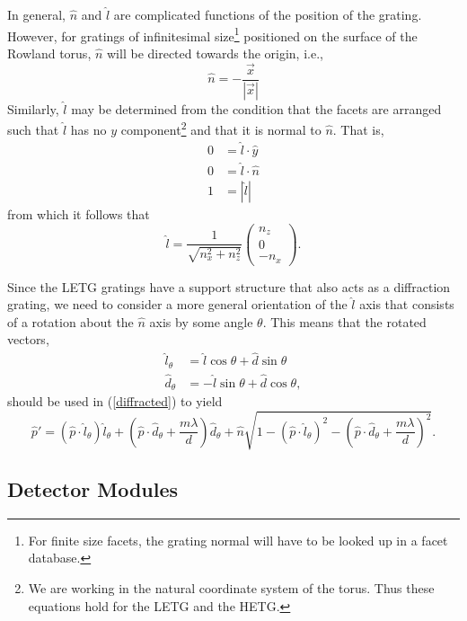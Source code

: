 \documentclass{article}
\newcommand{\eq}[1]{(\ref{#1})}
\newcommand{\p}{\hat{p}}
\newcommand{\x}{\vec{x}}
\begin{document}
 In general, $\hat{n}$ and $\hat{l}$ are complicated functions of the
 position of the grating.  However, for gratings of infinitesimal
 size\footnote{For finite size facets, the grating normal will have to be
 looked up in a facet database.} positioned on the surface of the Rowland
 torus, $\hat{n}$ will be directed towards the origin, i.e.,
\begin{equation}
    \hat{n} = -\frac{\x}{|\x|}
\end{equation}
 Similarly, $\hat{l}$ may be determined from the condition that the facets
 are arranged such that $\hat{l}$ has no $y$ component\footnote{We are
 working in the natural coordinate system of the torus.  Thus these
 equations hold for the LETG and the HETG.} and that it is normal to
 $\hat{n}$.  That is,
\begin{equation*}
\begin{split}
   0 &= \hat{l}\cdot\hat{y} \\
   0 &= \hat{l}\cdot\hat{n} \\
   1 &= |\hat{l}|
\end{split}
\end{equation*} 
 from which it follows that
\begin{equation} 
  \hat{l} = \frac{1}{\sqrt{n_x^2 + n_z^2}} 
              \begin{pmatrix} 
                 n_z\\
                 0\\
                 -n_x
              \end{pmatrix}.
\end{equation} 

 Since the LETG gratings have a support structure that also acts as a
 diffraction grating, we need to consider a more general orientation of the
 $\hat{l}$ axis that consists of a rotation about the $\hat{n}$ axis by some
 angle $\theta$.  This means that the rotated vectors,
\begin{align}
  \hat{l}_{\theta} &= \hat{l} \cos\theta + \hat{d}\sin\theta \\
  \hat{d}_{\theta} &= -\hat{l} \sin\theta + \hat{d}\cos\theta,
\end{align}
 should be used in \eq{diffracted} to yield
\begin{equation} 
  \p' = (\p\cdot\hat{l}_{\theta})\hat{l}_{\theta} 
        + (\p\cdot\hat{d}_{\theta} + \frac{m\lambda}{d})\hat{d}_{\theta}
        + \hat{n} \sqrt{1  
                       - (\p\cdot\hat{l}_{\theta})^2 
                       - (\p\cdot\hat{d}_{\theta} + \frac{m\lambda}{d})^2}.
\end{equation}





\subsection{Detector Modules}
\end{document}
